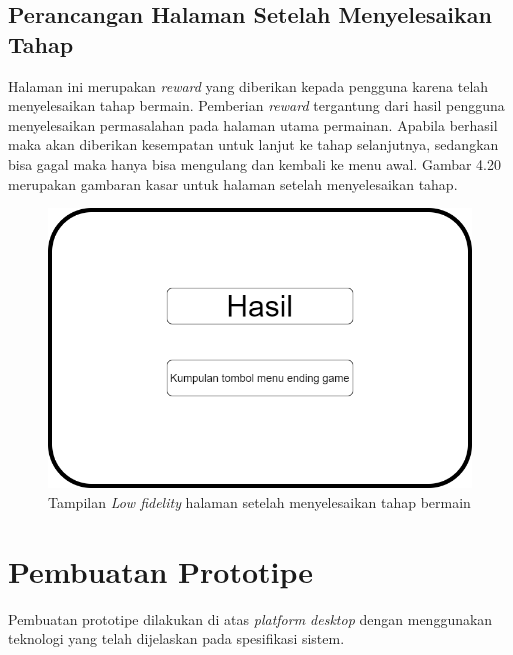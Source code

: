 	\subsection{Perancangan Halaman Setelah Menyelesaikan Tahap}
	Halaman ini merupakan \textit{reward} yang diberikan kepada pengguna karena telah menyelesaikan tahap bermain. Pemberian \textit{reward} tergantung dari hasil pengguna menyelesaikan permasalahan pada halaman utama permainan. Apabila berhasil maka akan diberikan kesempatan untuk lanjut ke tahap selanjutnya, sedangkan bisa gagal maka hanya bisa mengulang dan kembali ke menu awal. Gambar 4.20 merupakan gambaran kasar untuk halaman setelah menyelesaikan tahap.
	\begin{figure}
		\centering
		\includegraphics[width=\linewidth-80pt]{pics/low/low4}
		\caption{Tampilan \textit{Low fidelity} halaman setelah menyelesaikan tahap bermain}
	\end{figure}
	

\section{Pembuatan Prototipe}

Pembuatan prototipe dilakukan di atas \textit{platform desktop} dengan menggunakan teknologi yang telah dijelaskan pada spesifikasi sistem. 

